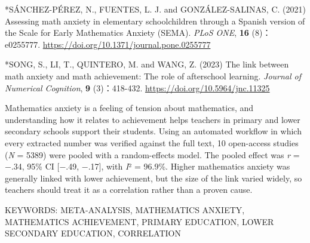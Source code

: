 \documentclass[
  lualatex, ja=standard, paper={182mm,257mm}, twocolumn, fontsize=8.5pt, baselineskip=13.5pt,
  line_length=24zw, column_gap=6.1mm, number_of_lines=45, head_space=24.5mm, gutter=16.25mm
]{jlreq}
\newcommand{\chapspaced}[1]{\par\vspace{13.5pt}\needspace{4\baselineskip}{\centering\gtfamily\bfseries #1\par}\nopagebreak}
\begin{document}
{\par\noindent{}\zw{} *SÁNCHEZ-PÉREZ, N., FUENTES, L. J. and GONZÁLEZ-SALINAS, C. (2021) Assessing math anxiety in elementary schoolchildren through a Spanish version of the Scale for Early Mathematics Anxiety (SEMA). \textit{PLoS ONE}, \textbf{16} (8)：e0255777. \url{https://doi.org/10.1371/journal.pone.0255777}\par
\par\noindent{}\zw{} *SONG, S., LI, T., QUINTERO, M. and WANG, Z. (2023) The link between math anxiety and math achievement: The role of afterschool learning. \textit{Journal of Numerical Cognition}, \textbf{9} (3)：418-432. \url{https://doi.org/10.5964/jnc.11325}\par
}
\chapspaced{Summary}
{\setlength{\parindent}{1\zw}\noindent Mathematics anxiety is a feeling of tension about mathematics, and understanding how it relates to achievement helps teachers in primary and lower secondary schools support their students. Using an automated workflow in which every extracted number was verified against the full text, 10 open-access studies (\textit{N} = 5389) were pooled with a random-effects model. The pooled effect was \textit{r} = \ensuremath{-}.34, 95\% CI [\ensuremath{-}.49, \ensuremath{-}.17], with \textit{I}² = 96.9\%. Higher mathematics anxiety was generally linked with lower achievement, but the size of the link varied widely, so teachers should treat it as a correlation rather than a proven cause.\par
KEYWORDS: META-ANALYSIS, MATHEMATICS ANXIETY, MATHEMATICS ACHIEVEMENT, PRIMARY EDUCATION, LOWER SECONDARY EDUCATION, CORRELATION\par}
\end{document}
